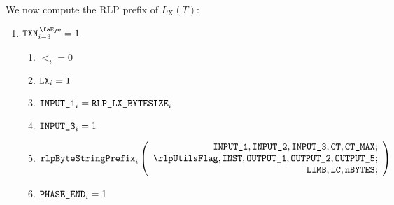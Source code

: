 We now compute the RLP prefix of $L _{\mathrm{X}}(T)$:
\begin{enumerate}[resume]
	\item \If $\isTxn _{i-3}=1$ \Then
		\begin{enumerate}
			\item $\lt _{i}=0$
			\item $\texttt{LX} _{i}=1$
			\item $\texttt{INPUT\_1} _{i} = \texttt{RLP\_LX\_BYTESIZE} _{i}$
			\item $\texttt{INPUT\_3} _{i} = 1$ 
			\item 
				\[
					\rlpBytestringPrefix _{i}
					\left(
					\begin{array}{r}
						\inputColumn{1},
						\inputColumn{2},
						\inputColumn{3},
						\ct,
						\maxCt; \\
						\rlpUtilsFlag,
						\INST,
						\outputColumn{1},
						\outputColumn{2},
						\outputColumn{5}; \\
						\limb,
						\lc,
						\limbsize; \\
					\end{array}
					\right)
				\]
			\item $\texttt{PHASE\_END} _{i}=1$
		\end{enumerate}
\end{enumerate}

